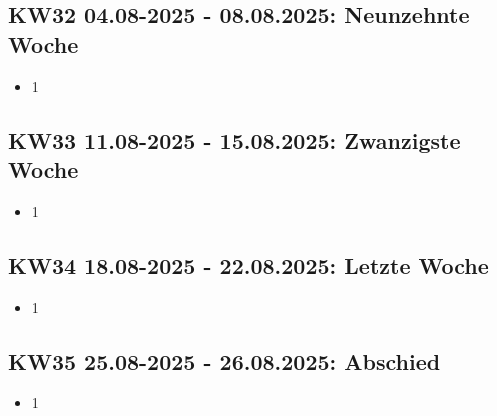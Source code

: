 \subsection{KW32 04.08-2025 - 08.08.2025: Neunzehnte Woche}
\begin{itemize}
  \item 1
\end{itemize}


\subsection{KW33 11.08-2025 - 15.08.2025: Zwanzigste Woche}
\begin{itemize}
  \item 1
\end{itemize}


\subsection{KW34 18.08-2025 - 22.08.2025: Letzte Woche}
\begin{itemize}
  \item 1
\end{itemize}


\subsection{KW35 25.08-2025 - 26.08.2025: Abschied}
\begin{itemize}
  \item 1
\end{itemize}